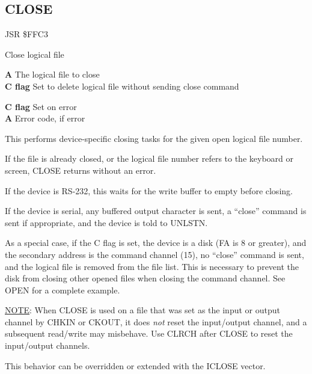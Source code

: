 
\newpage
\subsection{CLOSE}
\label{KERNAL Jump Table!CLOSE}
\begin{description}[leftmargin=2cm,style=nextline]
    \item [Address:] JSR \$FFC3
    \item [Description:] Close logical file
    \item [Inputs:]
        \textbf{A} The logical file to close \\
        \textbf{C flag} Set to delete logical file without sending close command
    \item [Outputs:]
        \textbf{C flag} Set on error \\
        \textbf{A} Error code, if error
    \item [Remarks:]
        This performs device-specific closing tasks for the given open logical file number.

        If the file is already closed, or the logical file number refers to the keyboard or screen, CLOSE returns without an error.

        If the device is RS-232, this waits for the write buffer to empty before closing.

        If the device is serial, any buffered output character is sent, a ``close'' command is sent if appropriate, and the device is told to UNLSTN.

        As a special case, if the C flag is set, the device is a disk (FA is 8 or greater), and the secondary address is the command channel (15), no ``close'' command is sent, and the logical file is removed from the file list. This is necessary to prevent the disk from closing other opened files when closing the command channel. See OPEN for a complete example.

        \underline{NOTE}: When CLOSE is used on a file that was set as the input or output channel by CHKIN or CKOUT, it does \emph{not} reset the input/output channel, and a subsequent read/write may misbehave. Use CLRCH after CLOSE to reset the input/output channels.

        This behavior can be overridden or extended with the ICLOSE vector.
    \item [Example:]
\end{description}


